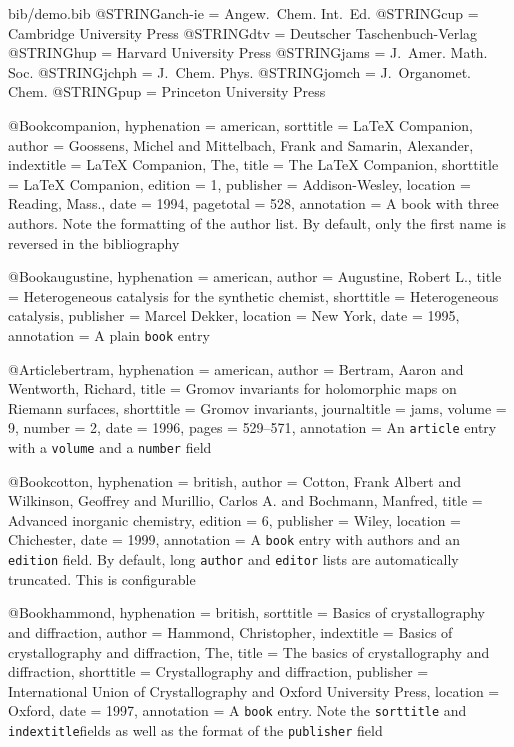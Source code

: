 \begin{filecontents*}{bib/demo.bib}
@STRING{anch-ie = {Angew.~Chem. Int.~Ed.} }
@STRING{cup	    = {Cambridge University Press} }
@STRING{dtv	    = {Deutscher Taschenbuch-Verlag} }
@STRING{hup	    = {Harvard University Press} }
@STRING{jams	= {J.~Amer. Math. Soc.} }
@STRING{jchph	= {J.~Chem. Phys.} }
@STRING{jomch	= {J.~Organomet. Chem.} }
@STRING{pup	    = {Princeton University Press} }

@Book{companion,
  hyphenation = {american},
  sorttitle	  = {LaTeX Companion},
  author	  = {Goossens, Michel and Mittelbach, Frank and Samarin, Alexander},
  indextitle  = {LaTeX Companion, The},
  title		  = {The LaTeX Companion},
  shorttitle  = {LaTeX Companion},
  edition	  = {1},
  publisher	  = {Addison-Wesley},
  location	  = {Reading, Mass.},
  date		  = {1994},
  pagetotal	  = {528},
  annotation  = {A book with three authors. Note the formatting of the author
                 list. By default, only the first name is reversed in the
                 bibliography}
}

@Book{augustine,
  hyphenation = {american},
  author	  = {Augustine, Robert L.},
  title		  = {Heterogeneous catalysis for the synthetic chemist},
  shorttitle  = {Heterogeneous catalysis},
  publisher	  = {Marcel Dekker},
  location	  = {New York},
  date		  = {1995},
  annotation  = {A plain \texttt{book} entry}
}

@Article{bertram,
  hyphenation = {american},
  author	  = {Bertram, Aaron and Wentworth, Richard},
  title		  = {Gromov invariants for holomorphic maps on Riemann surfaces},
  shorttitle  = {Gromov invariants},
  journaltitle  = jams,
  volume	  = {9},
  number	  = {2},
  date		  = {1996},
  pages		  = {529--571},
  annotation  = {An \texttt{article} entry with a \texttt{volume} and a \texttt{number} field}
}

@Book{cotton,
  hyphenation = {british},
  author	  = {Cotton, Frank Albert and Wilkinson, Geoffrey and Murillio,
                 Carlos A. and Bochmann, Manfred},
  title		  = {Advanced inorganic chemistry},
  edition	  = {6},
  publisher	  = {Wiley},
  location	  = {Chichester},
  date		  = {1999},
  annotation  = {A \texttt{book} entry with  authors and an
   \texttt{edition} field. By default, long \texttt{author} and
   \texttt{editor} lists are automatically truncated. This is configurable}
}

@Book{hammond,
  hyphenation  = {british},
  sorttitle	  = {Basics of crystallography and diffraction},
  author	  = {Hammond, Christopher},
  indextitle  = {Basics of crystallography and diffraction, The},
  title		  = {The basics of crystallography and diffraction},
  shorttitle  = {Crystallography and diffraction},
  publisher	  = {International Union of Crystallography and Oxford University Press},
  location	  = {Oxford},
  date		  = {1997},
  annotation  = {A \texttt{book} entry. Note the \texttt{sorttitle} and
   \texttt{indextitle}fields as well as the format of the \texttt{publisher}
   field}
}


\end{filecontents*}

